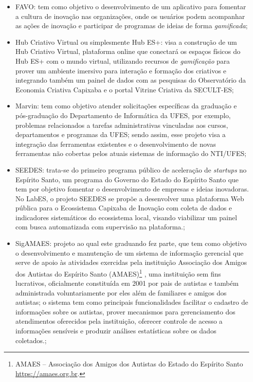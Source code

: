 \begin{itemize}
	\item FAVO: tem como objetivo o desenvolvimento de um aplicativo para fomentar a cultura de inovação nas organizações, onde os usuários podem acompanhar as ações de inovação e participar de programas de ideias de forma \textit{gamificada};
	
	\item Hub Criativo Virtual ou simplesmente Hub ES+: visa a construção de um Hub Criativo Virtual, plataforma online que conectará os espaços físicos do Hub ES+ com o mundo virtual, utilizando recursos de \textit{gamificação} para prover um ambiente imersivo para interação e formação dos criativos e integrando também um painel de dados com as pesquisas do Observatório da Economia Criativa Capixaba e o portal Vitrine Criativa da SECULT-ES;
	
	\item Marvin: tem como objetivo atender solicitações específicas da graduação e pós-graduação do Departamento de Informática da UFES, por exemplo, problemas relacionados a tarefas administrativas vinculadas aos cursos, departamentos e programas da UFES; sendo assim, esse projeto visa a integração das ferramentas existentes e o desenvolvimento de novas ferramentas não cobertas pelos atuais sistemas de informação do NTI/UFES;
	
	\item SEEDES: trata-se do primeiro programa público de aceleração de \textit{startups} no Espírito Santo, um programa do Governo do Estado do Espírito Santo que tem por objetivo fomentar o desenvolvimento de empresas e ideias inovadoras. No LabES, o projeto SEEDES se propõe a desenvolver uma plataforma Web pública para o Ecossistema Capixaba de Inovação com coleta de dados e indicadores sistemáticos do ecossistema local, visando viabilizar um painel com busca automatizada com supervisão na plataforma.;
	
	\item SigAMAES: projeto ao qual este graduando fez parte, que tem como objetivo o desenvolvimento e manutenção de um sistema de informação gerencial que serve de apoio às atividades exercidas pela instituição Associação dos Amigos dos Autistas do Espírito Santo (AMAES)\footnote{AMAES – Associação dos Amigos dos Autistas do Estado do Espírito Santo \url{https://amaes.org.br}.}
, uma instituição sem fins lucrativos, oficialmente constituída em 2001 por pais de autistas e também administrada voluntariamente por eles além de familiares e amigos dos autistas; o sistema tem como principais funcionalidades facilitar o cadastro de informações sobre os autistas, prover mecanismos para gerenciamento dos atendimentos oferecidos pela instituição, oferecer controle de acesso a informações sensíveis e produzir análises estatísticas sobre os dados coletados.;
\end{itemize}
